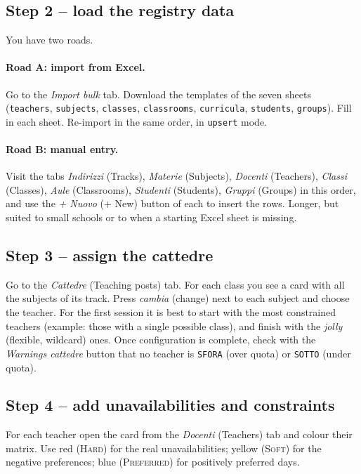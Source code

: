 \subsection{Step 2 -- load the registry data}

You have two roads.

\paragraph{Road A: import from Excel.}
Go to the \emph{Import bulk} tab. Download the templates of the
seven sheets (\texttt{teachers}, \texttt{subjects},
\texttt{classes}, \texttt{classrooms}, \texttt{curricula},
\texttt{students}, \texttt{groups}). Fill in each sheet. Re-import
in the same order, in \texttt{upsert} mode.

\paragraph{Road B: manual entry.}
Visit the tabs \emph{Indirizzi} (Tracks), \emph{Materie}
(Subjects), \emph{Docenti} (Teachers), \emph{Classi} (Classes),
\emph{Aule} (Classrooms), \emph{Studenti} (Students),
\emph{Gruppi} (Groups) in this order, and use the \emph{+ Nuovo}
(+ New) button of each to insert the rows. Longer, but suited to
small schools or to when a starting Excel sheet is missing.

\subsection{Step 3 -- assign the cattedre}

Go to the \emph{Cattedre} (Teaching posts) tab. For each class
you see a card with all the subjects of its track. Press
\emph{cambia} (change) next to each subject and choose the
teacher. For the first session it is best to start with the most
constrained teachers (example: those with a single possible
class), and finish with the \emph{jolly} (flexible, wildcard)
ones. Once configuration is complete, check with the
\emph{Warnings cattedre} button that no teacher is
\texttt{SFORA} (over quota) or \texttt{SOTTO} (under quota).

\subsection{Step 4 -- add unavailabilities and constraints}

For each teacher open the card from the \emph{Docenti} (Teachers)
tab and colour their matrix. Use red (\textsc{Hard}) for the real
unavailabilities; yellow (\textsc{Soft}) for the negative
preferences; blue (\textsc{Preferred}) for positively preferred
days.

